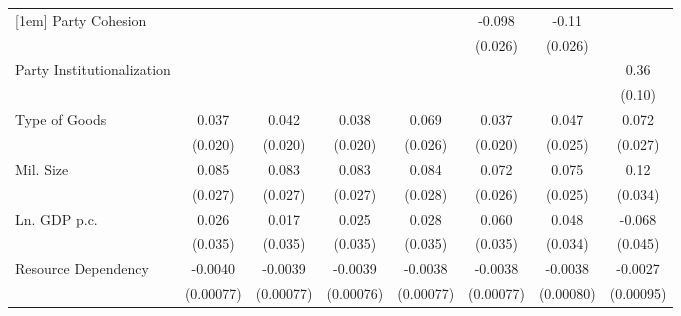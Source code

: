 \begin{table}[htbp]
\begin{tabular}{l*{7}{c}}
[1em]
Party Cohesion      &                     &                     &                     &                     &      -0.098\sym{***}&       -0.11\sym{***}&                     \\
                    &                     &                     &                     &                     &     (0.026)         &     (0.026)         &                     \\
[1em]
Party Institutionalization              &                     &                     &                     &                     &                     &                     &        0.36\sym{***}\\
                    &                     &                     &                     &                     &                     &                     &      (0.10)         \\
[1em]
Type of Goods      &       0.037         &       0.042\sym{*}  &       0.038         &       0.069\sym{**} &       0.037         &       0.047         &       0.072\sym{**} \\
                    &     (0.020)         &     (0.020)         &     (0.020)         &     (0.026)         &     (0.020)         &     (0.025)         &     (0.027)         \\
[1em]
Mil. Size         &       0.085\sym{**} &       0.083\sym{**} &       0.083\sym{**} &       0.084\sym{**} &       0.072\sym{**} &       0.075\sym{**} &        0.12\sym{***}\\
                    &     (0.027)         &     (0.027)         &     (0.027)         &     (0.028)         &     (0.026)         &     (0.025)         &     (0.034)         \\
[1em]
Ln. GDP p.c.           &       0.026         &       0.017         &       0.025         &       0.028         &       0.060         &       0.048         &      -0.068         \\
                    &     (0.035)         &     (0.035)         &     (0.035)         &     (0.035)         &     (0.035)         &     (0.034)         &     (0.045)         \\
[1em]
Resource Dependency          &     -0.0040\sym{***}&     -0.0039\sym{***}&     -0.0039\sym{***}&     -0.0038\sym{***}&     -0.0038\sym{***}&     -0.0038\sym{***}&     -0.0027\sym{**} \\
                    &   (0.00077)         &   (0.00077)         &   (0.00076)         &   (0.00077)         &   (0.00077)         &   (0.00080)         &   (0.00095)         \\

\end{tabular}
\end{table}
